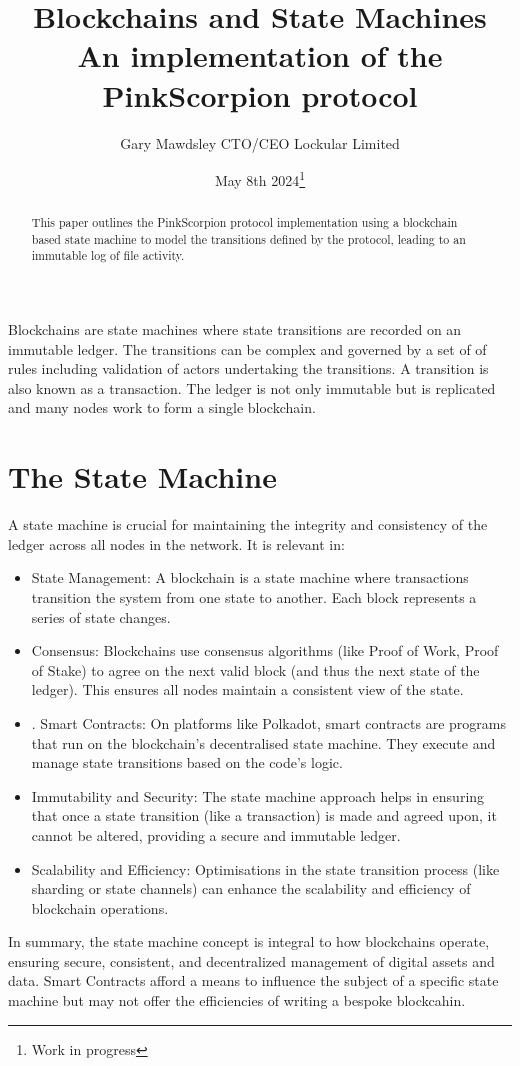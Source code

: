 \documentclass{tufte-handout}
\title{Blockchains and State Machines \\
\large An implementation of the PinkScorpion protocol}
\author[Gary Mawdsley]{Gary Mawdsley CTO/CEO Lockular Limited}
\date{May 8th 2024\thanks{Work in progress}}  %
\begin{document}
\maketitle%

\begin{abstract}
\noindent This paper outlines the PinkScorpion protocol implementation using a blockchain based state machine to model the transitions defined by the protocol,
leading to an immutable log of file activity.

\end{abstract}

Blockchains are state machines where state transitions are recorded on an immutable ledger. The transitions can be complex and governed by a set of of rules
including validation of actors undertaking the transitions. A transition is also known as a transaction. The ledger is not only immutable but is replicated
and many nodes work to form a single blockchain.
\section{The State Machine}\label{sec:page-layout}
A state machine is crucial for maintaining the integrity and consistency of the ledger across all nodes in the network.
It is relevant in:
\begin{itemize}
\item State Management: A blockchain is a state machine where transactions transition the system from one state to another. Each block represents a
series of state changes.
\item Consensus: Blockchains use consensus algorithms (like Proof of Work, Proof of Stake) to agree on the next valid block (and thus the next state of the ledger).
This ensures all nodes maintain a consistent view of the state.
\item. Smart Contracts: On platforms like Polkadot, smart contracts are programs that run on the blockchain's decentralised state machine. They execute
and manage state transitions based on the code's logic.
\item Immutability and Security: The state machine approach helps in ensuring that once a state transition (like a transaction) is made and agreed upon, it
cannot be altered, providing a secure and immutable ledger.
\item Scalability and Efficiency: Optimisations in the state transition process (like sharding or state channels) can enhance the scalability and efficiency
of blockchain operations.
\end{itemize}
In summary, the state machine concept is integral to how blockchains operate, ensuring secure, consistent, and decentralized management of digital assets and data.
Smart Contracts afford a means to influence the subject of a specific state machine but may not offer the efficiencies of writing a bespoke blockcahin.
\end{document}
